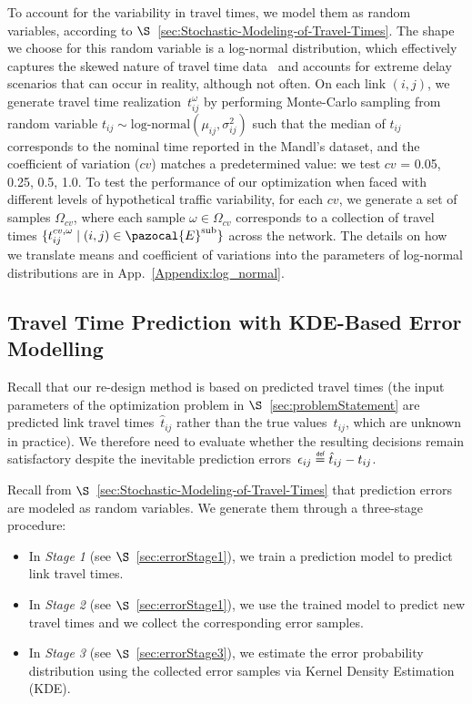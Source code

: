 \documentclass[a4paper,fleqn]{cas-sc}
\newcommand{\defeq}{\stackrel{\scalebox{0.5}{\ensuremath{\mathsf{\,def}}}}{=}}
\begin{document}
To account for the variability in travel times, we model them as random variables, according to $\S$~\ref{sec:Stochastic-Modeling-of-Travel-Times}. The shape we choose for this random variable is a log-normal distribution, which effectively captures the skewed nature of travel time data~\citep{guessous2014estimating} and accounts for extreme delay scenarios that can occur in reality, although not often.
%
On each link $(i,j)$, we generate travel time realization~$t_{ij}^\omega$ by performing Monte-Carlo sampling from random variable $t_{ij} \sim \text{log-normal}(\mu_{ij}, \sigma_{ij}^2)$ such that the median of $t_{ij}$ corresponds to the nominal time reported in the Mandl's dataset, and the coefficient of variation ($cv$) matches a predetermined value: we test $cv$ = 0.05, 0.25, 0.5, 1.0.
To test the performance of our optimization when faced with different levels of hypothetical traffic variability, for each $cv$, we generate a set of samples $\Omega_{cv}$, where each sample $\omega \in \Omega_{cv}$ corresponds to a collection of travel times $\{t_{ij}^{cv,\omega} \mid (i,j) \in \pazocal{E}^{\text{sub}}\}$ across the network. 
The details on how we translate means and coefficient of variations into the parameters of log-normal distributions are in App.~\ref{Appendix:log_normal}. 
\subsection{Travel Time Prediction with KDE-Based Error Modelling}
\label{sec:KDE}

Recall that our re-design method is based on predicted travel times (the input parameters of the optimization problem in $\S$~\ref{sec:problemStatement} are predicted link travel times~$\hat t_{ij}$ rather than the true values~$t_{ij}$, which are unknown in practice). We therefore need to evaluate whether the resulting decisions remain satisfactory despite the inevitable prediction errors~$\epsilon_{ij} \defeq \hat t_{ij}-t_{ij}$.

Recall from $\S$~\ref{sec:Stochastic-Modeling-of-Travel-Times} that prediction errors are modeled as random variables. 
We generate them through a three-stage procedure:
\begin{itemize}
\item In \emph{Stage 1} (see $\S$~\ref{sec:errorStage1}), we train a prediction model to predict link travel times. 
\item In \emph{Stage 2} (see $\S$~\ref{sec:errorStage1}), we use the trained model to predict new travel times and we collect the corresponding error samples.
\item In \emph{Stage 3} (see $\S$~\ref{sec:errorStage3}), we estimate the error probability distribution using the collected error samples via Kernel Density Estimation (KDE).
\end{itemize}
%
%
 
\end{document}
